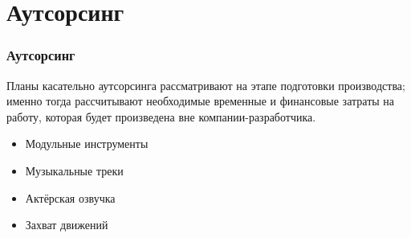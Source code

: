 \section{Аутсорсинг}
\begin{frame}
    \frametitle{Аутсорсинг}
    Планы касательно аутсорсинга рассматривают на этапе подготовки производства; именно тогда 
    рассчитывают необходимые временные и финансовые затраты на работу, которая будет произведена вне 
    компании-разработчика.
    \begin{itemize}
        \item Модульные инструменты
        \item Музыкальные треки
        \item Актёрская озвучка
        \item Захват движений
    \end{itemize}
\end{frame}